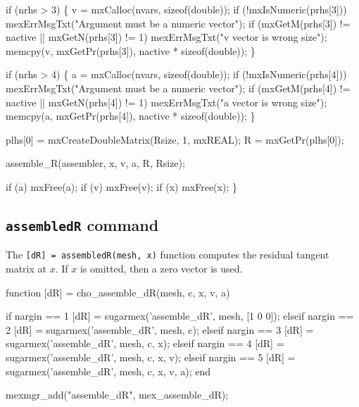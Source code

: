     if (nrhs > 3) \{
        v = mxCalloc(nvars, sizeof(double));
        if (!mxIsNumeric(prhs[3]))
            mexErrMsgTxt("Argument must be a numeric vector");
        if (mxGetM(prhs[3]) != nactive || mxGetN(prhs[3]) != 1)
            mexErrMsgTxt("v vector is wrong size");
        memcpy(v, mxGetPr(prhs[3]), nactive * sizeof(double));
    \}

    if (nrhs > 4) \{
        a = mxCalloc(nvars, sizeof(double));
        if (!mxIsNumeric(prhs[4]))
            mexErrMsgTxt("Argument must be a numeric vector");
        if (mxGetM(prhs[4]) != nactive || mxGetN(prhs[4]) != 1)
            mexErrMsgTxt("a vector is wrong size");
        memcpy(a, mxGetPr(prhs[4]), nactive * sizeof(double));
    \}

    plhs[0] = mxCreateDoubleMatrix(Rsize, 1, mxREAL);
    R       = mxGetPr(plhs[0]);

    assemble_R(assembler, x, v, a, R, Rsize); 

    if (a) mxFree(a);
    if (v) mxFree(v);
    if (x) mxFree(x);
\}

\nwendcode{}\nwdocspar


\subsection{{\tt{}assemble{}dR} command}

The {\tt{}[dR]\ =\ assemble{}dR(mesh,\ x)} function computes the
residual tangent matrix at $x$.  If $x$ is omitted,
then a zero vector is used.

\nwenddocs{}\endmoddef
function [dR] = cho_assemble_dR(mesh, c, x, v, a)

if nargin == 1
    [dR] = sugarmex('assemble_dR', mesh, [1 0 0]);
elseif nargin == 2
    [dR] = sugarmex('assemble_dR', mesh, c);
elseif nargin == 3
    [dR] = sugarmex('assemble_dR', mesh, c, x);
elseif nargin == 4
    [dR] = sugarmex('assemble_dR', mesh, c, x, v);
elseif nargin == 5
    [dR] = sugarmex('assemble_dR', mesh, c, x, v, a);
end
\nwendcode{}\nwdocspar

\nwenddocs{}\plusendmoddef
mexmgr_add("assemble_dR", mex_assemble_dR);
\nwendcode{}\nwdocspar

